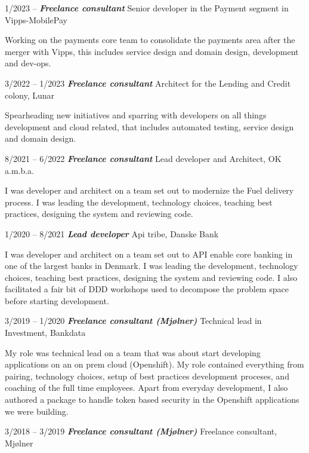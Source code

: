 \documentclass[10pt,a4,sans]{article}
\begin{document}
\begin{CV}
    \item[1/2023 -- ] \textbf{\emph{Freelance consultant}} Senior developer in the Payment segment in Vipps-MobilePay

Working on the payments core team to consolidate the payments area after the merger with Vipps, this includes service design and domain design, development and dev-ops.

    \item[3/2022 -- 1/2023] \textbf{\emph{Freelance consultant}} Architect for the Lending and Credit colony, Lunar

Spearheading new initiatives and sparring with developers on all things development and cloud related, that includes automated testing, service design and domain design.

    \item[8/2021 -- 6/2022] \textbf{\emph{Freelance consultant}} Lead developer and Architect, OK a.m.b.a.

I was developer and architect on a team set out to modernize the Fuel delivery process. I was leading the development, technology choices, teaching best practices, designing the system and reviewing code.      

    \item[1/2020 -- 8/2021] \textbf{\emph{Lead developer}} Api tribe, Danske Bank

I was developer and architect on a team set out to API enable core banking in one of the largest banks in Denmark. I was leading the development, technology choices, teaching best practices, designing the system and reviewing code. I also facilitated a fair bit of DDD workshops used to decompose the problem space before starting development.

    \item[3/2019 -- 1/2020] \textbf{\emph{Freelance consultant (Mjølner)}} Technical lead in Investment, Bankdata
    
My role was technical lead on a team that was about start developing applications on an on prem cloud (Openshift). My role contained everything from pairing, technology choices, setup of best practices development proceses, and coaching of the full time employees. Apart from everyday development, I also authored a package to handle token based security in the Openshift applications we were building.

    \item[3/2018 -- 3/2019] \textbf{\emph{Freelance consultant (Mjølner)}} Freelance consultant, Mjølner
    

\end{CV}
\end{document}
